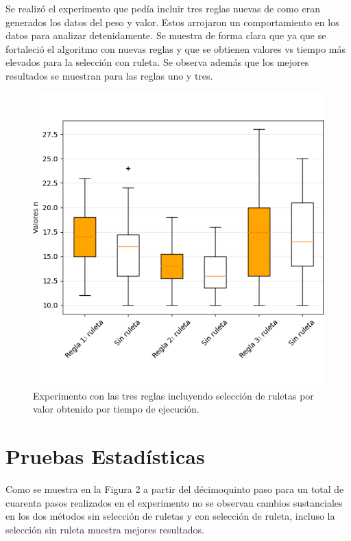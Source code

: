 \documentclass{article}
\begin{document}
Se realizó el experimento que pedía incluir tres reglas nuevas de como eran generados los datos del peso y valor. Estos arrojaron un comportamiento en los datos para analizar detenidamente. Se muestra de forma clara que ya que se fortaleció el algoritmo con nuevas reglas y que se obtienen valores vs tiempo más elevados para la selección con ruleta. Se observa además que los mejores resultados se muestran para las reglas uno y tres. 

\begin{figure}
\centering
	\includegraphics[scale=0.8]{Figure_1.png}
	\caption{Experimento con las tres reglas incluyendo selección de ruletas por valor obtenido por tiempo de ejecución.}
	\label{1}		
\end{figure}

\section{Pruebas Estadísticas}
Como se muestra en la Figura 2 a partir del décimoquinto paso para un total de cuarenta pasos realizados en el experimento no se observan cambios sustanciales en los dos métodos sin selección de ruletas y con selección de ruleta, incluso la selección sin ruleta muestra mejores resultados. 
\end{document}

